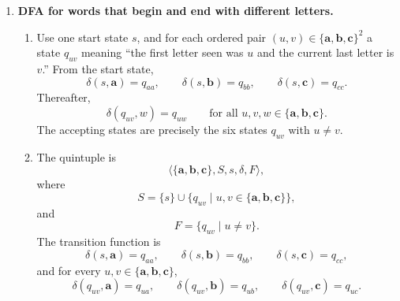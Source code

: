 \documentclass[11pt,openany]{book}
\begin{document}
\begin{enumerate}[{1.}1.]
\begin{enumerate}
\item For four or fewer operators, use exactly the same construction with
\[
q_{d,m}\qquad (0\leq d\leq 5,\ 0\leq m\leq 4),
\]
again plus a dead state. The same transition rules apply, with the bounds $3$ and $2$ replaced by $5$ and $4$, respectively. The final states are all $q_{1,m}$ with $0\leq m\leq 4$.

\item For eight or fewer operators, use the same DFA schema once more, now with
\[
q_{d,m}\qquad (0\leq d\leq 9,\ 0\leq m\leq 8),
\]
plus a dead state. On operands the machine increments $d$; on operators it checks that $d\geq 2$ and then decrements $d$ while incrementing $m$. The final states are all $q_{1,m}$ with $0\leq m\leq 8$.

\item The set of \emph{all} postfix expressions is not FAD. Intuitively, a recognizer must keep track of how many partial results are currently on the stack, and that number is unbounded. More formally, the strings
\[
\pmb{A},\ \pmb{AA},\ \pmb{AAA},\ \ldots,\ \pmb{A}^n,\ \ldots
\]
have pairwise different futures: from $\pmb{A}^n$, the continuation $\pmb{+}^{ n-1}$ completes a legal postfix expression, but the same continuation does not complete a legal expression from $\pmb{A}^m$ when $m\neq n$. Therefore infinitely many distinct states would be required.
\end{enumerate}

\item \textbf{DFA for words that begin and end with different letters.}

\begin{enumerate}
\item Use one start state $s$, and for each ordered pair $(u,v)\in\{\pmb{a},\pmb{b},\pmb{c}\}^2$ a state $q_{uv}$ meaning ``the first letter seen was $u$ and the current last letter is $v$.'' From the start state,
\[
\delta(s,\pmb{a})=q_{aa},\qquad \delta(s,\pmb{b})=q_{bb},\qquad \delta(s,\pmb{c})=q_{cc}.
\]
Thereafter,
\[
\delta(q_{uv},w)=q_{uw}\qquad\text{for all }u,v,w\in\{\pmb{a},\pmb{b},\pmb{c}\}.
\]
The accepting states are precisely the six states $q_{uv}$ with $u\neq v$.

\item The quintuple is
\[
\langle\{\pmb{a},\pmb{b},\pmb{c}\},S,s,\delta,F\rangle,
\]
where
\[
S=\{s\}\cup\{q_{uv}\mid u,v\in\{\pmb{a},\pmb{b},\pmb{c}\}\},
\]
and
\[
F=\{q_{uv}\mid u\neq v\}.
\]
The transition function is
\[
\delta(s,\pmb{a})=q_{aa},\qquad \delta(s,\pmb{b})=q_{bb},\qquad \delta(s,\pmb{c})=q_{cc},
\]
and for every $u,v\in\{\pmb{a},\pmb{b},\pmb{c}\}$,
\[
\delta(q_{uv},\pmb{a})=q_{ua},\qquad
\delta(q_{uv},\pmb{b})=q_{ub},\qquad
\delta(q_{uv},\pmb{c})=q_{uc}.
\]
\end{enumerate}


\end{enumerate}
\end{document}
